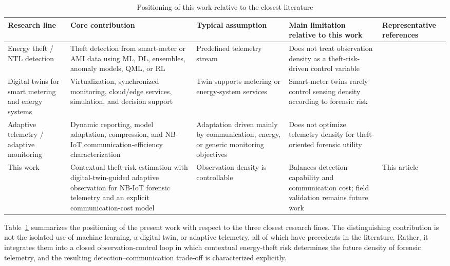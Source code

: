 \documentclass{ieeeaccess}
\begin{document}
\begin{table}[!ht]
\centering
\caption{Positioning of this work relative to the closest literature}
\label{tab:rw_comparison}
\begin{tabular}{|p{2.4cm}|p{4.8cm}|p{3.3cm}|p{3.3cm}|p{1.7cm}|}
\hline
\textbf{Research line} & \textbf{Core contribution} & \textbf{Typical assumption} & \textbf{Main limitation relative to this work} & \textbf{Representative references} \\
\hline
Energy theft / NTL detection & Theft detection from smart-meter or AMI data using ML, DL, ensembles, anomaly models, QML, or RL & Predefined telemetry stream & Does not treat observation density as a theft-risk-driven control variable & \cite{b1,b2,b4,b5,b6,b7,b8,b9,b12,b13,b14,b38} \\
\hline
Digital twins for smart metering and energy systems & Virtualization, synchronized monitoring, cloud/edge services, simulation, and decision support & Twin supports metering or energy-system services & Smart-meter twins rarely control sensing density according to forensic risk & \cite{b18,b20,b21,b22,b39,b40} \\
\hline
Adaptive telemetry / adaptive monitoring & Dynamic reporting, model adaptation, compression, and NB-IoT communication-efficiency characterization & Adaptation driven mainly by communication, energy, or generic monitoring objectives & Does not optimize telemetry density for theft-oriented forensic utility & \cite{b26,b27,b28,b29,b30,b31,b32,b33,b34,b35} \\
\hline
This work & Contextual theft-risk estimation with digital-twin-guided adaptive observation for NB-IoT forensic telemetry and an explicit communication-cost model & Observation density is controllable & Balances detection capability and communication cost; field validation remains future work & This article \\
\hline
\end{tabular}
\end{table}

Table~\ref{tab:rw_comparison} summarizes the positioning of the present work with respect to the three closest research lines. The distinguishing contribution is not the isolated use of machine learning, a digital twin, or adaptive telemetry, all of which have precedents in the literature. Rather, it integrates them into a closed observation-control loop in which contextual energy-theft risk determines the future density of forensic telemetry, and the resulting detection--communication trade-off is characterized explicitly.
\end{document}
